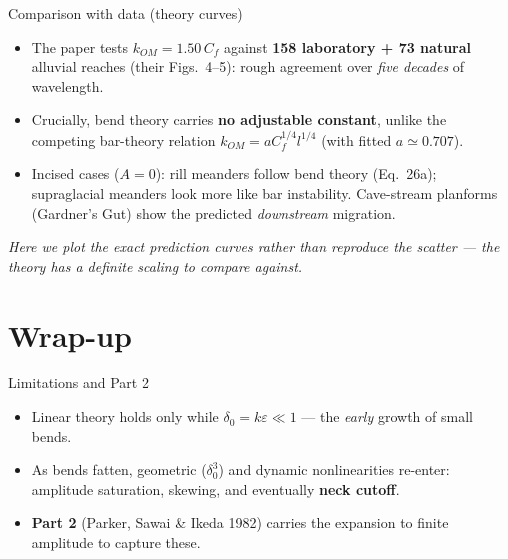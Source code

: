 \documentclass[aspectratio=169,10pt]{beamer}
\newcommand{\hl}[2]{\textcolor{#1}{\textbf{#2}}}
\begin{document}
\begin{frame}{Comparison with data (theory curves)}
  \begin{itemize}
    \item The paper tests $k_{OM}=1.50\,C_f$ against \textbf{158 laboratory + 73 natural}
      alluvial reaches (their Figs.~4--5): rough agreement over \emph{five decades} of
      wavelength.
    \item Crucially, bend theory carries \hl{cGrowth}{no adjustable constant}, unlike the
      competing bar-theory relation $k_{OM}=aC_f^{1/4}l^{1/4}$ (with fitted $a\simeq0.707$).
    \item Incised cases ($A=0$): rill meanders follow bend theory (Eq.~26a); supraglacial
      meanders look more like bar instability. Cave-stream planforms (Gardner's Gut) show
      the predicted \emph{downstream} migration.
  \end{itemize}
  \vfill
  \centering\footnotesize\itshape
  Here we plot the exact prediction curves rather than reproduce the scatter ---
  the theory has a definite scaling to compare against.
\end{frame}

\section{Wrap-up}

\begin{frame}{Limitations and Part 2}
  \begin{itemize}
    \item Linear theory holds only while $\delta_0=k\varepsilon\ll1$ --- the \emph{early}
      growth of small bends.
    \item As bends fatten, geometric ($\delta_0^3$) and dynamic nonlinearities re-enter:
      amplitude saturation, skewing, and eventually \hl{cEros}{neck cutoff}.
    \item \textbf{Part 2} (Parker, Sawai \& Ikeda 1982) carries the expansion to
      finite amplitude to capture these.
  \end{itemize}
\end{frame}
\end{document}
